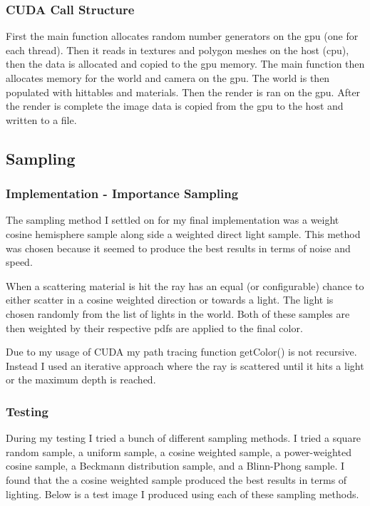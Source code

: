 \documentclass{article}
\begin{document}
        \subsubsection{CUDA Call Structure}
        First the main function allocates random number generators on the gpu (one for each thread). Then it reads in textures and polygon meshes on the host (cpu), then the data is allocated and copied to the gpu memory. The main function then allocates memory for the world and camera on the gpu. The world is then populated with hittables and materials. Then the render is ran on the gpu. After the render is complete the image data is copied from the gpu to the host and written to a file. \par



    \subsection{Sampling}



        \subsubsection{Implementation - Importance Sampling}
        The sampling method I settled on for my final implementation was a weight cosine hemisphere sample along side a weighted direct light sample. This method was chosen because it seemed to produce the best results in terms of noise and speed. \par
        When a scattering material is hit the ray has an equal (or configurable) chance to either scatter in a cosine weighted direction or towards a light. The light is chosen randomly from the list of lights in the world. Both of these samples are then weighted by their respective pdfs are applied to the final color. \par
        Due to my usage of CUDA my path tracing function getColor() is not recursive. Instead I used an iterative approach where the ray is scattered until it hits a light or the maximum depth is reached. \par 



        \subsubsection{Testing}
        During my testing I tried a bunch of different sampling methods. I tried a square random sample, a uniform sample, a cosine weighted sample, a power-weighted cosine sample, a Beckmann distribution sample, and a Blinn-Phong sample. I found that the a cosine weighted sample produced the best results in terms of lighting. Below is a test image I produced using each of these sampling methods. \par
\end{document}
